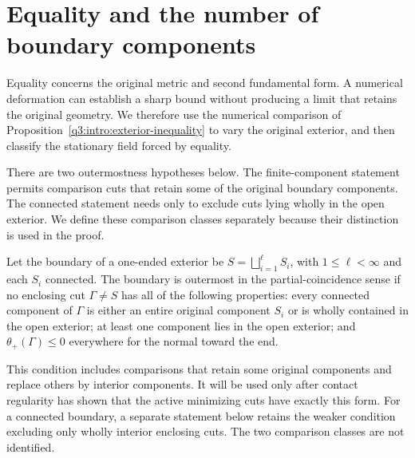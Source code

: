 \section{Equality and the number of boundary components}
\label{q3:rigidity:setup}

Equality concerns the original metric and second fundamental form.
A numerical deformation can establish a sharp bound without producing
a limit that retains the original geometry.  We therefore use the
numerical comparison of Proposition~\ref{q3:intro:exterior-inequality}
to vary the original exterior, and then classify the stationary field
forced by equality.

There are two outermostness hypotheses below.  The finite-component
statement permits comparison cuts that retain some of the original
boundary components.  The connected statement needs only to exclude
cuts lying wholly in the open exterior.  We define these comparison
classes separately because their distinction is used in the proof.

\begin{definition}
\label{q3:rigidity:partial-outermostness}
Let the boundary of a one-ended exterior be
$S=\bigsqcup_{i=1}^{\ell}S_i$, with $1\leq\ell<\infty$ and each
$S_i$ connected. The boundary is outermost in the partial-coincidence
sense if no enclosing cut $\Gamma\ne S$ has all of the following
properties: every connected component of $\Gamma$ is either an entire
original component $S_i$ or is wholly contained in the open exterior;
at least one component lies in the open exterior; and
$\theta_+(\Gamma)\leq0$ everywhere for the normal toward the end.
\end{definition}

This condition includes comparisons that retain some original
components and replace others by interior components. It will be used
only after contact regularity has shown that the active minimizing
cuts have exactly this form. For a connected boundary, a separate
statement below retains the weaker condition excluding only wholly
interior enclosing cuts. The two comparison classes are not identified.

